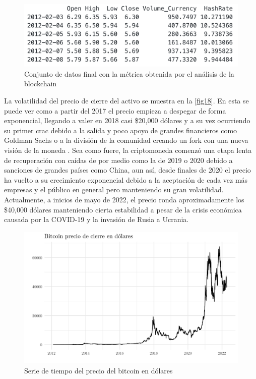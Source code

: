 \begin{figure}[h!]
	\centering
	\includegraphics[scale=0.5]{Chapter5/ohlcv_complete.png}
	\caption{Conjunto de datos final con la métrica obtenida por el análisis de la blockchain}
	\label{fig17}
\end{figure}

La volatilidad del precio de cierre del activo se muestra en la \autoref{fig18}. En esta se puede ver como a partir del 2017 el precio empieza a despegar de forma exponencial, llegando a valer en 2018 casi \$20,000 dólares y a su vez ocurriendo su primer crac debido a la salida y poco apoyo de grandes financieros como Goldman Sachs o a la división de la comunidad creando un fork con una nueva visión de la moneda \parencite{peterssonWhyBitcoinCrashed2018}. Sea como fuere, la criptomoneda comenzó una etapa lenta de recuperación con caídas de por medio como la de 2019 o 2020 debido a sanciones de grandes países como China, aun así, desde finales de 2020 el precio ha vuelto a su crecimiento exponencial debido a la aceptación de cada vez más empresas y el público en general pero manteniendo su gran volatilidad. Actualmente, a inicios de mayo de 2022, el precio ronda aproximadamente los \$40,000 dólares manteniendo cierta estabilidad a pesar de la crisis económica causada por la COVID-19 y la invasión de Rusia a Ucrania.

\begin{figure}[h!]
	\centering
	\includegraphics[scale=0.35]{Chapter5/btc_price.png}
	\caption{Serie de tiempo del precio del bitcoin en dólares}
	\label{fig18}
\end{figure}

